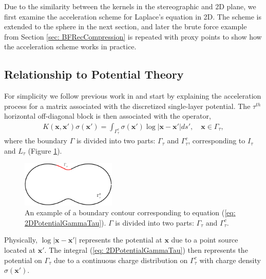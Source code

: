 \documentclass{sfuthesis}
\begin{document}
Due to the similarity between the kernels in the stereographic and 2D plane, we first examine the acceleration scheme for Laplace's equation in 2D. 
The scheme is extended to the sphere in the next section, and later the brute force example from Section \ref{sec: BFRecCompression} is repeated with proxy points to show how the acceleration scheme works in practice. 


\subsection{Relationship to Potential Theory}
For simplicity we follow previous work in \cite{MartRokh2005, GillYoungMart2012, HoGreen2012} and start by explaining the acceleration process for a matrix associated with the discretized single-layer potential. The $\tau^{th}$ horizontal off-diagonal block is then associated with the operator,
\begin{align}
	K(\mathbf{x}, \mathbf{x}')\sigma(\mathbf{x}')=\int_{\Gamma_\tau^c} \sigma(\mathbf{x}') \log|\mathbf{x}-\mathbf{x}'|ds', \quad \mathbf{x}\in \Gamma_\tau, \label{eq: 2DPotentialGammaTau} 
\end{align}
where the boundary $\Gamma$ is divided into two parts: $\Gamma_\tau$ and $\Gamma_\tau^c$, corresponding to $I_\tau$ and $L_\tau$ (Figure \ref{fig: 2DGammaTauGammaTauC}).

\begin{figure}
	\centering
    	\includegraphics[width=0.4\textwidth]{2DGammaTauGammaTauC}
    	\caption{An example of a boundary contour corresponding to equation (\ref{eq: 2DPotentialGammaTau}). $\Gamma$ is divided into two parts: $\Gamma_\tau$ and $\Gamma_\tau^c$. }
    	\label{fig: 2DGammaTauGammaTauC}
\end{figure}

Physically, $\log|\mathbf{x}-\mathbf{x}'|$ represents the potential at $\mathbf{x}$ due to a point source located at $\mathbf{x}'$. The integral (\ref{eq: 2DPotentialGammaTau}) then represents the potential on $\Gamma_\tau$ due to a continuous charge distribution on $\Gamma_\tau^c$ with charge density $\sigma(\mathbf{x}')$. 
\end{document}
